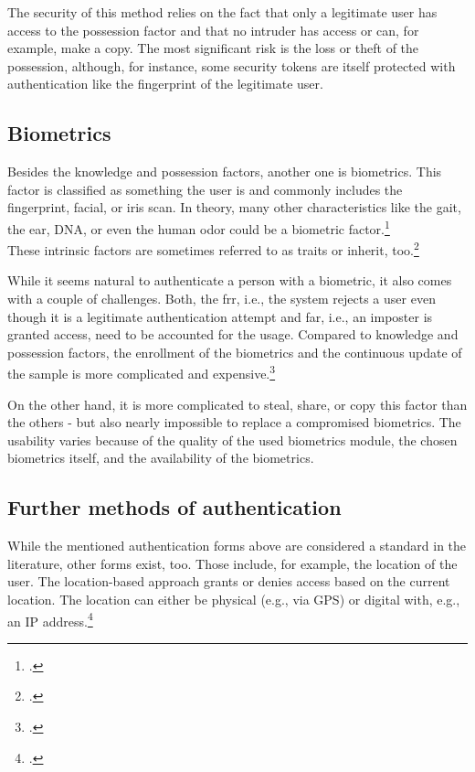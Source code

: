 The security of this method relies on the fact that only a legitimate user has access to the possession factor and that no intruder has access or can, for example, make a copy. The most significant risk is the loss or theft of the possession, although, for instance, some security tokens are itself protected with authentication like the fingerprint of the legitimate user.

\subsection{Biometrics}

Besides the knowledge and possession factors, another one is biometrics. This factor is classified as \frqq something the user is\flqq{} and commonly includes the fingerprint, facial, or iris scan. In theory, many other characteristics like the gait, the ear, DNA, or even the human odor could be a biometric factor.\footcite[See][30--34]{Jain2011}\\
These intrinsic factors are sometimes referred to as traits or inherit, too.\footcite[See][186]{dasgupta2017multi}

While it seems natural to authenticate a person with a biometric, it also comes with a couple of challenges. Both, the \gls{frr}, i.e., the system rejects a user even though it is a legitimate authentication attempt and \gls{far}, i.e., an imposter is granted access, need to be accounted for the usage. Compared to knowledge and possession factors, the enrollment of the biometrics and the continuous update of the sample is more complicated and expensive.\footcites[See][18--24]{Jain2011}[See][34--37]{265831}

On the other hand, it is more complicated to steal, share, or copy this factor than the others - but also nearly impossible to replace a compromised biometrics. The usability varies because of the quality of the used biometrics module, the chosen biometrics itself, and the availability of the biometrics.

\begin{figure}[hbt]
	\centering
	
	\caption{}
	\label{fig:biometrics_auth_flow}
\end{figure}

\subsection{Further methods of authentication}

While the mentioned authentication forms above are considered a standard in the literature, other forms exist, too. Those include, for example, the location of the user. The location-based approach grants or denies access based on the current location. The location can either be physical (e.g., via GPS) or digital with, e.g., an IP address.\footcite{6296127}

